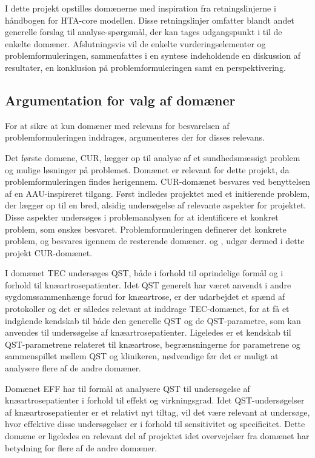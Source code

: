 I dette projekt opstilles domænerne med inspiration fra retningslinjerne i håndbogen for HTA-core modellen. Disse retningslinjer omfatter blandt andet generelle forslag til analyse-spørgsmål, der kan tages udgangspunkt i til de enkelte domæner. Afslutningsvis vil de enkelte vurderingselementer og problemformuleringen, sammenfattes i en syntese indeholdende en diskussion af resultater, en konklusion på problemformuleringen samt en perspektivering. 

\subsection{Argumentation for valg af domæner}
For at sikre at kun domæner med relevans for besvarelsen af problemformuleringen inddrages, argumenteres der for disses relevans. 

Det første domæne, CUR, lægger op til analyse af et sundhedsmæssigt problem og mulige løsninger på problemet. Domænet er relevant for dette projekt, da problemformuleringen findes herigennem. CUR-domænet besvares ved benyttelsen af en AAU-inspireret tilgang. Først indledes projektet med et initierende problem, der lægger op til en bred, alsidig undersøgelse af relevante aspekter for projektet. Disse aspekter undersøges i problemanalysen for at identificere et konkret problem, som ønskes besvaret. Problemformuleringen definerer det konkrete problem, og besvares igennem de resterende domæner.  og , udgør dermed i dette projekt CUR-domænet. 

I domænet TEC undersøges QST, både i forhold til oprindelige formål og i forhold til knæartrosepatienter. Idet QST generelt har været anvendt i andre sygdomssammenhænge forud for knæartrose, er der udarbejdet et spænd af protokoller og det er således relevant at inddrage TEC-domænet, for at få et indgående kendskab til både den generelle QST og de QST-parametre, som kan anvendes til undersøgelse af knæartrosepatienter. Ligeledes er et kendskab til QST-parametrene relateret til knæartrose, begrænsningerne for parametrene og sammenspillet mellem QST og klinikeren, nødvendige før det er muligt at analysere flere af de andre domæner. 

Domænet EFF har til formål at analysere QST til undersøgelse af knæartrosepatienter i forhold til effekt og virkningsgrad. Idet QST-undersøgelser af knæartrosepatienter er et relativt nyt tiltag, vil det være relevant at undersøge, hvor effektive disse undersøgelser er i forhold til sensitivitet og specificitet. Dette domæne er ligeledes en relevant del af projektet idet overvejelser fra domænet har betydning for flere af de andre domæner. 

